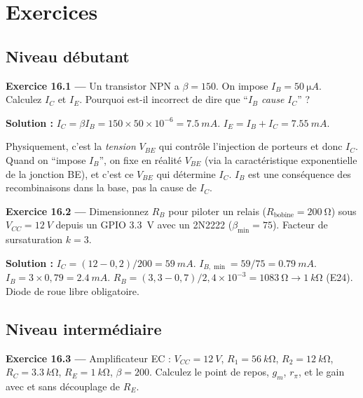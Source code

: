 \documentclass[12pt,a4paper,twoside]{book}
\begin{document}
\section*{Exercices}

\subsection*{Niveau débutant}

\textbf{Exercice 16.1 ---} Un transistor NPN a $\beta = 150$. On impose $I_B = \SI{50}{\micro A}$. Calculez $I_C$ et $I_E$. Pourquoi est-il incorrect de dire que ``$I_B$ \textit{cause} $I_C$'' ?

\begin{pratique}
\textbf{Solution :} $I_C = \beta I_B = 150\times50\times10^{-6} = \SI{7.5}{mA}$. $I_E = I_B + I_C = \SI{7.55}{mA}$.

Physiquement, c'est la \textit{tension} $V_{BE}$ qui contrôle l'injection de porteurs et donc $I_C$. Quand on ``impose $I_B$'', on fixe en réalité $V_{BE}$ (via la caractéristique exponentielle de la jonction BE), et c'est ce $V_{BE}$ qui détermine $I_C$. $I_B$ est une conséquence des recombinaisons dans la base, pas la cause de $I_C$.
\end{pratique}

\textbf{Exercice 16.2 ---} Dimensionnez $R_B$ pour piloter un relais ($R_{\text{bobine}} = \SI{200}{\ohm}$) sous $V_{CC} = \SI{12}{V}$ depuis un GPIO \SI{3.3}{V} avec un 2N2222 ($\beta_{\min} = 75$). Facteur de sursaturation $k = 3$.

\begin{pratique}
\textbf{Solution :} $I_C = (12-0{,}2)/200 = \SI{59}{mA}$. $I_{B,\min} = 59/75 = \SI{0.79}{mA}$. $I_B = 3\times0{,}79 = \SI{2.4}{mA}$. $R_B = (3{,}3 - 0{,}7)/2{,}4\times10^{-3} = \SI{1083}{\ohm} \to \SI{1}{k\ohm}$ (E24). Diode de roue libre obligatoire.
\end{pratique}

\subsection*{Niveau intermédiaire}

\textbf{Exercice 16.3 ---} Amplificateur EC : $V_{CC} = \SI{12}{V}$, $R_1 = \SI{56}{k\ohm}$, $R_2 = \SI{12}{k\ohm}$, $R_C = \SI{3.3}{k\ohm}$, $R_E = \SI{1}{k\ohm}$, $\beta = 200$. Calculez le point de repos, $g_m$, $r_\pi$, et le gain avec et sans découplage de $R_E$.
\end{document}

